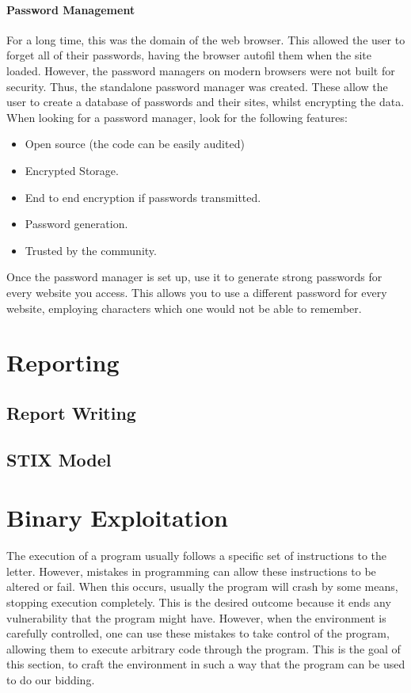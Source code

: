 \documentclass[a4paper,11pt]{report}
\begin{document}
		\subsubsection{Password Management}
			For a long time, this was the domain of the web browser. 
			This allowed the user to forget all of their passwords, having the browser autofil them when the site loaded.
			However, the password managers on modern browsers were not built for security. 
			Thus, the standalone password manager was created. 
			These allow the user to create a database of passwords and their sites, whilst encrypting the data. 
			When looking for a password manager, look for the following features:
			\begin{itemize}
				\item Open source (the code can be easily audited)
				\item Encrypted Storage. 
				\item End to end encryption if passwords transmitted.
				\item Password generation. 
				\item Trusted by the community. 
			\end{itemize}
			Once the password manager is set up, use it to generate strong passwords for every website you access. 
			This allows you to use a different password for every website, employing characters which one would not be able to remember. 

\chapter{Reporting}
	\section{Report Writing}
	\section{STIX Model}
\chapter{Binary Exploitation}
		The execution of a program usually follows a specific set of instructions to the letter. 
		However, mistakes in programming can allow these instructions to be altered or fail. 
		When this occurs, usually the program will crash by some means, stopping execution completely. 
		This is the desired outcome because it ends any vulnerability that the program might have. 
		However, when the environment is carefully controlled, one can use these mistakes to take control of the program, 
		allowing them to execute arbitrary code through the program.\cite{HackingAOE} 
		This is the goal of this section, to craft the environment in such a way that the program can be used to do our bidding. 
\end{document}
